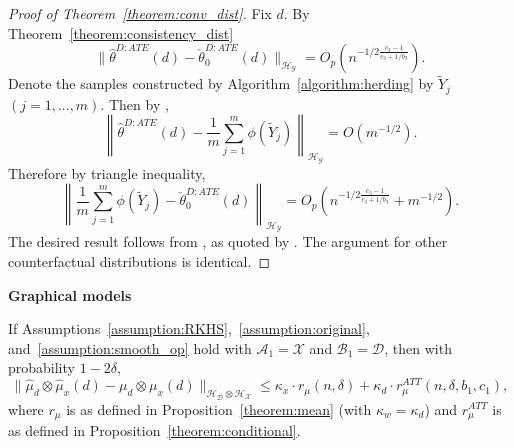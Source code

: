 \begin{proof}[Proof of Theorem~\ref{theorem:conv_dist}]
    Fix $d$. By Theorem~\ref{theorem:consistency_dist}
    $$
    \|\hat{\theta}^{D:ATE}(d)-\check{\theta}_0^{D:ATE}(d)\|_{\mathcal{H}_{\mathcal{Y}}}=O_p\left(n^{-1/2\frac{c_3-1}{c_3+1/b_3}}\right).
    $$
    Denote the samples constructed by Algorithm~\ref{algorithm:herding} by $\tilde{Y}_j$ $(j=1,...,m)$. Then by \cite[Section 4.2]{bach2012equivalence},
    $$
    \left\|\hat{\theta}^{D:ATE}(d)-\frac{1}{m}\sum_{j=1}^m \phi(\tilde{Y}_j)\right\|_{\mathcal{H}_{\mathcal{Y}}}=O(m^{-1/2}).
    $$
    Therefore by triangle inequality,
    $$
    \left\|\frac{1}{m}\sum_{j=1}^m \phi(\tilde{Y}_j)-\check{\theta}_0^{D:ATE}(d)\right\|_{\mathcal{H}_{\mathcal{Y}}}=O_p\left(n^{-1/2\frac{c_3-1}{c_3+1/b_3}}+m^{-1/2}\right).
    $$
    The desired result follows from \cite{sriperumbudur2016optimal}, as quoted by \cite[Theorem 1.1]{simon2020metrizing}. The argument for other counterfactual distributions is identical.
\end{proof}

\textbf{Graphical models}

\begin{proposition}\label{prop:delta_dag}
If Assumptions~\ref{assumption:RKHS},~\ref{assumption:original}, and~\ref{assumption:smooth_op} hold with $\mathcal{A}_1=\mathcal{X}$ and $\mathcal{B}_1=\mathcal{D}$, then with probability $1-2\delta$,
$$
\|\hat{\mu}_d\otimes \hat{\mu}_x(d)-\mu_d\otimes \mu_x(d)\|_{\mathcal{H}_{\mathcal{D}}\otimes \mathcal{H}_{\mathcal{X}}}\leq \kappa_x \cdot r_{\mu} (n,\delta)+\kappa_d\cdot   r^{ATT}_{\mu}(n,\delta,b_1,c_1),
$$
where $r_{\mu}$ is as defined in Proposition~\ref{theorem:mean} (with $\kappa_w=\kappa_d$) and $r^{ATT}_{\mu}$ is as defined in Proposition~\ref{theorem:conditional}.
\end{proposition}

